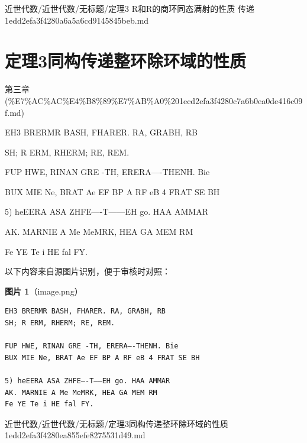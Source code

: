 \begin{note}[来源路径]

近世代数/近世代数/无标题/定理3 R和R的商环同态满射的性质 传递 1edd2efa3f4280a6a5a6cd9145845beb.md

\end{note}

\section*{定理3同构传递整环除环域的性质}

\begin{note}[来源上级主题]

第三章 (\%E7\%AC\%AC\%E4\%B8\%89\%E7\%AB\%A0\%201ecd2efa3f4280c7a6b0ea0de416c09f.md)

\end{note}

\begin{theorem}[定理3同构传递整环除环域的性质]

EH3 BRERMR BASH, FHARER. RA, GRABH, RB

SH; R ERM, RHERM; RE, REM.

FUP HWE, RINAN GRE -TH, ERERA—-THENH. Bie

BUX MIE Ne, BRAT Ae EF BP A RF eB 4 FRAT SE BH

5) heEERA ASA ZHFE—-T——EH go. HAA AMMAR

AK. MARNIE A Me MeMRK, HEA GA MEM RM

Fe YE Te i HE fal FY.

\end{theorem}

\begin{note}
以下内容来自源图片识别，便于审核时对照：

\textbf{图片 1}（image.png）
\begin{Verbatim}[fontsize=\small]
EH3 BRERMR BASH, FHARER. RA, GRABH, RB
SH; R ERM, RHERM; RE, REM.

FUP HWE, RINAN GRE -TH, ERERA—-THENH. Bie
BUX MIE Ne, BRAT Ae EF BP A RF eB 4 FRAT SE BH

5) heEERA ASA ZHFE—-T——EH go. HAA AMMAR
AK. MARNIE A Me MeMRK, HEA GA MEM RM
Fe YE Te i HE fal FY.
\end{Verbatim}

\end{note}

\begin{note}[来源路径]

近世代数/近世代数/无标题/定理3同构传递整环除环域的性质 1edd2efa3f4280ea855efe8275531d49.md

\end{note}

